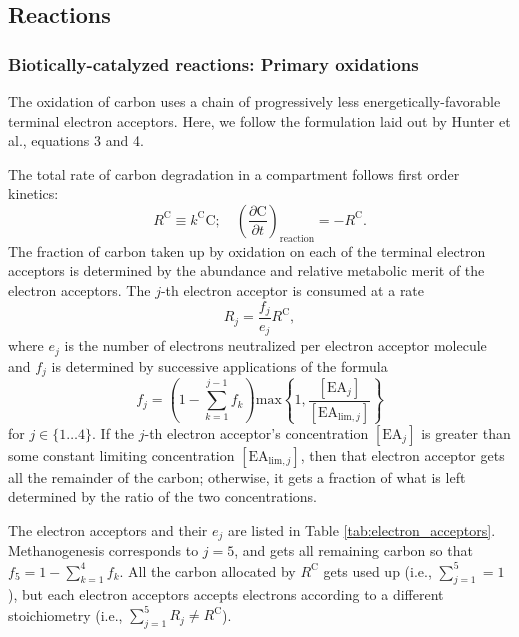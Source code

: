 \documentclass{report}
\newcommand{\m}[1]{ \mathrm{#1} }
\begin{document}
\subsection{Reactions}
\subsubsection{Biotically-catalyzed reactions: Primary oxidations}
The oxidation of carbon uses a chain of progressively less energetically-favorable terminal
electron acceptors. Here, we follow the formulation laid out by Hunter et
al.\cite{hunterkinetic1998}, equations 3 and 4.

The total rate of carbon degradation in a compartment follows first order kinetics:
\begin{equation}
  R^\m{C} \equiv k^\m{C} \m{C}; \quad \left( \frac{\partial \m{C}}{\partial t}
  \right)_\text{reaction} = -R^\m{C}.
\end{equation}
The fraction of carbon taken up by oxidation on each of the terminal electron acceptors is
determined by the abundance and relative metabolic merit of the electron acceptors. The $j$-th electron acceptor is
consumed at a rate
\begin{equation}
  R_j = \frac{f_j}{e_j} R^\m{C},
\end{equation}
where $e_j$ is the number of electrons neutralized per electron acceptor molecule and $f_j$
is determined by successive applications of the formula
\begin{equation}
  f_j = \left( 1 - \sum_{k=1}^{j-1} f_k \right) \mathrm{max} \left\{ 1,
  \frac{[\mathrm{EA}_j]}{[\mathrm{EA}_{\mathrm{lim},j}]} \right \}
\end{equation}
for $j \in \{ 1 \ldots 4 \}$. If the $j$-th electron acceptor's concentration $[\mathrm{EA}_j]$ is greater than some constant
limiting concentration $[\mathrm{EA}_{\mathrm{lim},j}]$, then that electron acceptor gets
all the remainder of the carbon; otherwise, it gets a fraction of what is left determined by
the ratio of the two concentrations.

The electron acceptors and their $e_j$ are listed in Table \ref{tab:electron_acceptors}. Methanogenesis
corresponds to $j=5$, and gets all remaining carbon so that $f_5 = 1 - \sum_{k=1}^4 f_k$.
All the carbon allocated by $R^\m{C}$ gets used up (i.e., $\sum_{j=1}^5 = 1$), but each electron
acceptors accepts electrons according to a different stoichiometry (i.e., $\sum_{j=1}^5 R_j \ne
R^\m{C}$).
\end{document}
